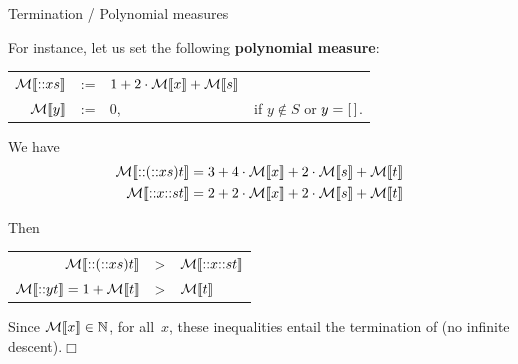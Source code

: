 %
\begin{frame}{Termination / Polynomial measures}

  For instance, let us set the following \textbf{polynomial measure}:
  \begin{center}
    \begin{tabular}{r@{\;\,}c@{\;\;}ll}
      \(\mathcal{M}\llbracket{\textsf{::}{x}{s}}\rrbracket\) & := & \(1 + 2\cdot\mathcal{M}\llbracket{x}\rrbracket +
      \mathcal{M}\llbracket{s}\rrbracket\)\\
      \(\mathcal{M}\llbracket{y}\rrbracket\) & := & \(0\), & if \(y \not\in S\) or
      \(y=[\,]\).
    \end{tabular}
  \end{center}

  We have
  \begin{align*}
    \mathcal{M}\llbracket{\textsf{::}{(\textsf{::}{x}{s})}{t}}\rrbracket &  =  3 +
    4\cdot\mathcal{M}\llbracket{x}\rrbracket + 2\cdot\mathcal{M}\llbracket{s}\rrbracket + \mathcal{M}\llbracket{t}\rrbracket\\
    \mathcal{M}\llbracket{\textsf{::}{x}{\textsf{::}{s}{t}}}\rrbracket &  =  2 +
    2\cdot\mathcal{M}\llbracket{x}\rrbracket + 2\cdot\mathcal{M}\llbracket{s}\rrbracket + \mathcal{M}\llbracket{t}\rrbracket
  \end{align*}

  Then
  \begin{center}
    \begin{tabular}{r@{\;\;}c@{\;\;}l}
      \(\mathcal{M}\llbracket{\textsf{::}{(\textsf{::}{x}{s})}{t}}\rrbracket\) & >
      & \(\mathcal{M}\llbracket{\textsf{::}{x}{\textsf{::}{s}{t}}}\rrbracket\)\\
      \(\mathcal{M}\llbracket{\textsf{::}{y}{t}}\rrbracket = 1 + \mathcal{M}\llbracket{t}\rrbracket\) & > &
      \(\mathcal{M}\llbracket{t}\rrbracket\)
    \end{tabular}
  \end{center}

  Since \(\mathcal{M}\llbracket{x}\rrbracket \in \mathbb{N}\), for all~\(x\), these
  inequalities entail the termination of  (no infinite
  descent).\hfill\(\Box\)

\end{frame}

